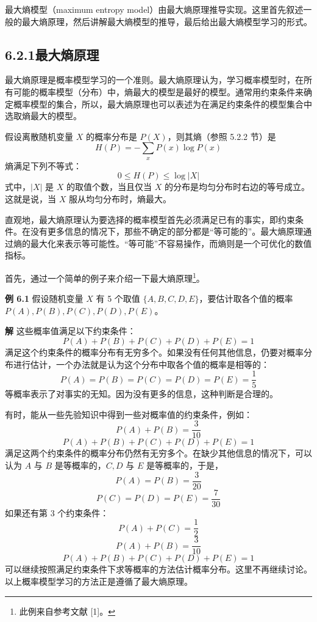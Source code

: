 \documentclass[UTF8,12pt,a4paper,fontset=fandol]{ctexart}
\begin{document}
最大熵模型（maximum entropy model）由最大熵原理推导实现。这里首先叙述一般的最大熵原理，然后讲解最大熵模型的推导，最后给出最大熵模型学习的形式。

\subsection*{6.2.1\quad 最大熵原理}

最大熵原理是概率模型学习的一个准则。最大熵原理认为，学习概率模型时，在所有可能的概率模型（分布）中，熵最大的模型是最好的模型。通常用约束条件来确定概率模型的集合，所以，最大熵原理也可以表述为在满足约束条件的模型集合中选取熵最大的模型。

假设离散随机变量 $X$ 的概率分布是 $P(X)$，则其熵（参照 5.2.2 节）是
\begin{equation}
H(P)=-\sum_x P(x)\log P(x)
\tag{6.9}
\end{equation}
熵满足下列不等式：
\[
0\leq H(P)\leq \log |X|
\]
式中，$|X|$ 是 $X$ 的取值个数，当且仅当 $X$ 的分布是均匀分布时右边的等号成立。这就是说，当 $X$ 服从均匀分布时，熵最大。

直观地，最大熵原理认为要选择的概率模型首先必须满足已有的事实，即约束条件。在没有更多信息的情况下，那些不确定的部分都是“等可能的”。最大熵原理通过熵的最大化来表示等可能性。“等可能”不容易操作，而熵则是一个可优化的数值指标。

首先，通过一个简单的例子来介绍一下最大熵原理\footnote{此例来自参考文献 [1]。}。

\noindent\textbf{例 6.1}\quad
假设随机变量 $X$ 有 5 个取值 $\{A,B,C,D,E\}$，要估计取各个值的概率 $P(A),P(B),P(C),P(D),P(E)$。

\noindent\textbf{解}\quad
这些概率值满足以下约束条件：
\[
P(A)+P(B)+P(C)+P(D)+P(E)=1
\]
满足这个约束条件的概率分布有无穷多个。如果没有任何其他信息，仍要对概率分布进行估计，一个办法就是认为这个分布中取各个值的概率是相等的：
\[
P(A)=P(B)=P(C)=P(D)=P(E)=\frac{1}{5}
\]
等概率表示了对事实的无知。因为没有更多的信息，这种判断是合理的。

有时，能从一些先验知识中得到一些对概率值的约束条件，例如：
\[
P(A)+P(B)=\frac{3}{10}
\]
\[
P(A)+P(B)+P(C)+P(D)+P(E)=1
\]
满足这两个约束条件的概率分布仍然有无穷多个。在缺少其他信息的情况下，可以认为 $A$ 与 $B$ 是等概率的，$C,D$ 与 $E$ 是等概率的，于是，
\[
P(A)=P(B)=\frac{3}{20}
\]
\[
P(C)=P(D)=P(E)=\frac{7}{30}
\]
如果还有第 3 个约束条件：
\[
P(A)+P(C)=\frac{1}{2}
\]
\[
P(A)+P(B)=\frac{3}{10}
\]
\[
P(A)+P(B)+P(C)+P(D)+P(E)=1
\]
可以继续按照满足约束条件下求等概率的方法估计概率分布。这里不再继续讨论。以上概率模型学习的方法正是遵循了最大熵原理。
\end{document}
